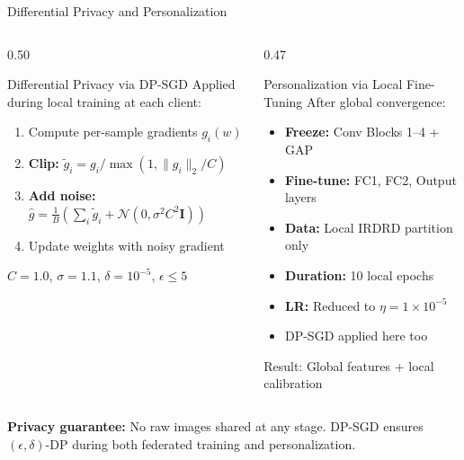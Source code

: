 \documentclass[aspectratio=169, 11pt]{beamer}
\begin{document}
\begin{frame}{Differential Privacy and Personalization}
  \begin{columns}[T]
    \begin{column}{0.50\textwidth}
      \begin{block}{Differential Privacy via DP-SGD}\small
        Applied during local training at each client:
        \begin{enumerate}
          \item Compute per-sample gradients $g_i(w)$
          \item \textbf{Clip:} $\tilde{g}_i = g_i \big/ \max(1, \|g_i\|_2 / C)$
          \item \textbf{Add noise:} $\hat{g} = \frac{1}{B}\!\left(\sum_i \tilde{g}_i + \mathcal{N}(0, \sigma^2 C^2 \mathbf{I})\right)$
          \item Update weights with noisy gradient
        \end{enumerate}
        \vspace{2pt}
        $C=1.0$, $\sigma=1.1$, $\delta=10^{-5}$, $\epsilon \leq 5$
      \end{block}
    \end{column}
    \begin{column}{0.47\textwidth}
      \begin{block}{Personalization via Local Fine-Tuning}\small
        After global convergence:
        \begin{itemize}
          \item \textbf{Freeze:} Conv Blocks 1--4 + GAP
          \item \textbf{Fine-tune:} FC1, FC2, Output layers
          \item \textbf{Data:} Local IRDRD partition only
          \item \textbf{Duration:} 10 local epochs
          \item \textbf{LR:} Reduced to $\eta = 1\times10^{-5}$
          \item DP-SGD applied here too
        \end{itemize}
        \vspace{2pt}
        Result: Global features + local calibration
      \end{block}
    \end{column}
  \end{columns}
  \vspace{4pt}
  \begin{center}
    \small
    \textbf{Privacy guarantee:} No raw images shared at any stage. DP-SGD ensures $(\epsilon, \delta)$-DP during both federated training and personalization.
  \end{center}
\end{frame}
\end{document}
